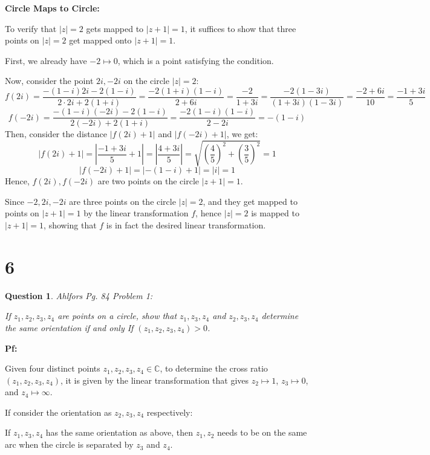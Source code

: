 \documentclass{article}
\newtheorem{question}{Question}
\begin{document}
\hfill

\textbf{Circle Maps to Circle:}

To verify that $|z|=2$ gets mapped to $|z+1|=1$, it suffices to show that three points on $|z|=2$ get mapped onto $|z+1|=1$.

First, we already have $-2 \mapsto 0$, which is a point satisfying the condition.

Now, consider the point $2i, -2i$ on the circle $|z|=2$:
$$f(2i)=\frac{-(1-i)2i-2(1-i)}{2\cdot 2i+2(1+i)} = \frac{-2(1+i)(1-i)}{2+6i}=\frac{-2}{1+3i}=\frac{-2(1-3i)}{(1+3i)(1-3i)}=\frac{-2+6i}{10}=\frac{-1+3i}{5}$$
$$f(-2i)=\frac{-(1-i)(-2i)-2(1-i)}{2(-2i)+2(1+i)}=\frac{-2(1-i)(1-i)}{2-2i}=-(1-i)$$
Then, consider the distance $|f(2i)+1|$ and $|f(-2i)+1|$, we get:
$$|f(2i)+1|=\left|\frac{-1+3i}{5}+1\right|=\left|\frac{4+3i}{5}\right|=\sqrt{\left(\frac{4}{5}\right)^2+\left(\frac{3}{5}\right)^2}=1$$
$$|f(-2i)+1|=|-(1-i)+1|=|i|=1$$
Hence, $f(2i),f(-2i)$ are two points on the circle $|z+1|=1$.

Since $-2,2i,-2i$ are three points on the circle $|z|=2$, and they get mapped to points on $|z+1|=1$ by the linear transformation $f$,
hence $|z|=2$ is mapped to $|z+1|=1$, showing that $f$ is in fact the desired linear transformation.




\break

\section*{6}
\begin{myBox}[]{}
    \begin{question}
        Ahlfors Pg. 84 Problem 1:

        If $z_1,z_2,z_3,z_4$ are points on a circle, show that $z_1,z_3,z_4$ and $z_2,z_3,z_4$ determine the same orientation if and only If
        $(z_1,z_2,z_3,z_4)>0$.
    \end{question}
\end{myBox}

\textbf{Pf:}

Given four distinct points $z_1,z_2,z_3,z_4\in\mathbb{C}$, to determine the cross ratio $(z_1,z_2,z_3,z_4)$, it is given by the linear transformation
that gives $z_2\mapsto 1$, $z_3\mapsto 0$, and $z_4\mapsto \infty$.

If consider the orientation as $z_2,z_3,z_4$ respectively:

If $z_1,z_3,z_4$ has the same orientation as above, then $z_1,z_2$ needs to be on the same arc when the circle is separated by $z_3$ and $z_4$.
\end{document}

